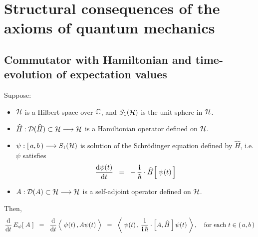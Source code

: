 

\section{Structural consequences of the axioms of quantum mechanics}
\setcounter{theorem}{0}
\setcounter{equation}{0}


\renewcommand{\theenumi}{\roman{enumi}}
\renewcommand{\labelenumi}{\textnormal{(\theenumi)}$\;\;$}


\vskip 0.5cm
\subsection{Commutator with Hamiltonian and time-evolution of expectation values}

\begin{proposition}
\mbox{}
\vskip 0.1cm
\noindent
Suppose:
\begin{itemize}
\item
	$\mathcal{H}$ is a Hilbert space over $\mathbb{C}$,
	and $S_{1}(\mathcal{H})$ is the unit sphere in $\mathcal{H}$.
\item
	$\widehat{H} : \mathcal{D}(\widehat{H}) \subset \mathcal{H} \longrightarrow \mathcal{H}$
	is a Hamiltonian operator defined on $\mathcal{H}$.
\item
	$\psi : [\,a,b\,) \longrightarrow S_{1}(\mathcal{H})$ is solution of the Schr\"{o}dinger equation defined by $\widehat{H}$, i.e.
	$\psi$ satisfies
	\begin{equation*}
	\dfrac{\d\psi(t)}{\d t}
	\;\; = \;\;
		-\,\dfrac{\i}{\hbar}\cdot\widehat{H}\!\left[\;\overset{{\color{white}.}}{\psi(t)}\,\right]
	\end{equation*}
\item
	$A : \mathcal{D}(A) \subset \mathcal{H} \longrightarrow \mathcal{H}$
	is a self-adjoint operator defined on $\mathcal{H}$.
\end{itemize}
Then,
\begin{equation*}
\dfrac{\d}{\d t}\, E_{\psi}\!\left[\;A\;\right]
\;\; = \;\;
	\dfrac{\d}{\d t} \left\langle\; \psi(t) \,, A\psi(\overset{{\color{white}.}}{t})\;\right\rangle
\;\; = \;\;
	\left\langle\;
		\psi(t)
		\,,\,
		\dfrac{1}{\i\,\hbar}\cdot\left[A,\widehat{H}\,\right]\psi(t)
		\;\right\rangle,
\quad
\textnormal{for each $t \in (\,a,b\,)$}
\end{equation*}
\end{proposition}


